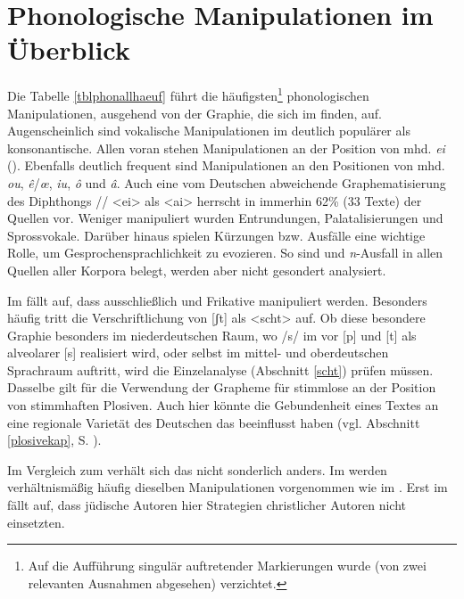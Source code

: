 \section{Phonologische Manipulationen im Überblick}\label{phonalles} 
Die Tabelle \ref{tblphonallhaeuf} führt die häufigsten\footnote{Auf die Aufführung singulär auftretender Markierungen wurde (von zwei relevanten Ausnahmen abgesehen) verzichtet.} phonologischen Manipulationen, ausgehend von der Graphie, die sich im  finden, auf. Augenscheinlich sind vokalische Manipulationen im  deutlich populärer als konsonantische. Allen voran stehen Manipulationen an der Position von mhd. \textit{ei} (). Ebenfalls deutlich frequent sind Manipulationen an den Positionen von mhd. \textit{ou}, \textit{ê}/\textit{œ}, \textit{iu}, \textit{ô} und \textit{â}. Auch eine vom Deutschen abweichende Graphematisierung des Diphthongs  // <ei> als <ai> herrscht in immerhin 62\% (33 Texte) der Quellen vor. Weniger manipuliert wurden Entrundungen, Palatalisierungen und Sprossvokale. Darüber hinaus spielen Kürzungen bzw. Ausfälle eine wichtige Rolle, um Gesprochensprachlichkeit zu evozieren. So sind  und \textit{n}-Ausfall in allen Quellen aller Korpora belegt, werden aber nicht gesondert analysiert.

Im  fällt auf, dass ausschließlich  und Frikative manipuliert werden. Besonders häufig tritt die Verschriftlichung von [ʃt] als <scht> auf. Ob diese besondere Graphie besonders im niederdeutschen Raum, wo /s/ im  vor [p] und [t] als alveolarer [s]  realisiert wird, oder selbst im mittel- und oberdeutschen Sprachraum auftritt, wird die Einzelanalyse (Abschnitt \ref{scht}) prüfen müssen. Dasselbe gilt für die Verwendung der Grapheme für stimmlose  an der Position von stimmhaften Plosiven. Auch hier könnte die  Gebundenheit eines Textes an eine regionale Varietät des Deutschen das  beeinflusst haben (vgl. Abschnitt \ref{plosivekap}, S. \pageref{plosivekap}). 
 
 Im Vergleich zum  verhält sich das  nicht sonderlich anders. Im  werden verhältnismäßig häufig dieselben Manipulationen vorgenommen wie im . Erst im  fällt auf, dass jüdische Autoren hier Strategien christlicher Autoren nicht einsetzten.\\ 
 
